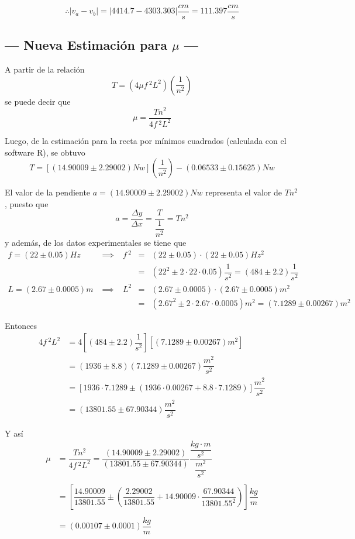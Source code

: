 \documentclass[10pt,a4paper]{article}
\begin{document}
 	$$\therefore |v_a-v_b|=\left|4414.7-4303.303\right|\frac{cm}{s}=111.397\frac{cm}{s}$$
 	
 	\subsection{--- Nueva Estimación para $ \mu $ ---}
	\label{sub:nueva_estim}
 	
 	A partir de la relación 
 	$$T=\left(4\mu f\,^2 L^2\right)\left(\dfrac{1}{n^2}\right)$$
 	se puede decir que
 	$$\mu=\dfrac{Tn^2}{4f\,^2L^2}$$
 	
 	Luego, de la estimación para la recta por mínimos cuadrados (calculada con el software R), se obtuvo 
 	$$ T=[(14.90009\pm 2.29002) Nw]\left(\dfrac{1}{n^2}\right)-(0.06533\pm 0.15625) Nw $$
 	
 	El valor de la pendiente $a=(14.90009\pm 2.29002) Nw$ representa el valor de $ Tn^2 $, puesto que
 	$$a=\dfrac{\Delta y}{\Delta x}=\dfrac{T}{\dfrac{1}{n^2}}=Tn^2$$ 
	y además, de los datos experimentales se tiene que \\[2mm]
	\[
		\begin{array}{lcccl}
			f = (22 \pm 0.05) Hz & \;\implies\; & f\,^2&=&(22\pm0.05)\cdot(22\pm0.05)Hz^2\\
			&&&=&(22^2\pm2\cdot22\cdot0.05)\dfrac{1}{s^2}=(484\pm2.2)\dfrac{1}{s^2} \\[5mm]
			L=(2.67\pm0.0005)m & \;\implies\; & L^2 & = & (2.67\pm0.0005)\cdot(2.67\pm0.0005)m^2 \\[2mm]
			&&& = & (2.67^2\pm2\cdot2.67\cdot0.0005)m^2=(7.1289\pm0.00267)m^2
		\end{array}
		\]
 	
 	Entonces
 	\begin{align*}
 		4f\,^2L^2&=4\left[(484\pm2.2)\dfrac{1}{s^2}\right]\left[(7.1289\pm0.00267)m^2\right]\\
 		&=(1936\pm8.8)(7.1289\pm0.00267)\dfrac{m^2}{s^2}\\
 		&=[1936\cdot7.1289\pm(1936\cdot0.00267+8.8\cdot7.1289)]\dfrac{m^2}{s^2}\\
 		&=(13801.55\pm 67.90344)\dfrac{m^2}{s^2}
 	\end{align*}
 
 	Y así
 	\begin{align*}
 		\mu&=\dfrac{Tn^2}{4f\,^2L^2}=\dfrac{(14.90009\pm 2.29002)}{(13801.55\pm 67.90344)}\dfrac{\dfrac{kg\cdot m}{s^2}}{\dfrac{m^2}{s^2}}\\\\
 		&=\left[\dfrac{14.90009}{13801.55}\pm\left(\dfrac{2.29002}{13801.55}+14.90009\cdot\dfrac{67.90344}{13801.55^2}\right)\right]\dfrac{kg}{m}\\\\
 		&=(0.00107\pm0.0001)\dfrac{kg}{m}
 	\end{align*}
\end{document}
